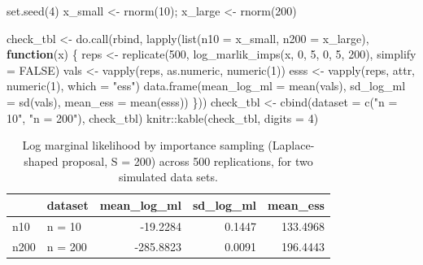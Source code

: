 \documentclass[
  letterpaper,
  DIV=11,
  numbers=noendperiod]{scrreprt}
\newenvironment{Shaded}{\begin{snugshade}}{\end{snugshade}}
\newcommand{\AttributeTok}[1]{\textcolor[rgb]{0.40,0.45,0.13}{#1}}
\newcommand{\ConstantTok}[1]{\textcolor[rgb]{0.56,0.35,0.01}{#1}}
\newcommand{\ControlFlowTok}[1]{\textcolor[rgb]{0.00,0.23,0.31}{\textbf{#1}}}
\newcommand{\DecValTok}[1]{\textcolor[rgb]{0.68,0.00,0.00}{#1}}
\newcommand{\FunctionTok}[1]{\textcolor[rgb]{0.28,0.35,0.67}{#1}}
\newcommand{\NormalTok}[1]{\textcolor[rgb]{0.00,0.23,0.31}{#1}}
\newcommand{\OtherTok}[1]{\textcolor[rgb]{0.00,0.23,0.31}{#1}}
\newcommand{\SpecialCharTok}[1]{\textcolor[rgb]{0.37,0.37,0.37}{#1}}
\newcommand{\StringTok}[1]{\textcolor[rgb]{0.13,0.47,0.30}{#1}}
\begin{document}
\begin{Shaded}
\begin{Highlighting}[]
\FunctionTok{set.seed}\NormalTok{(}\DecValTok{4}\NormalTok{)}
\NormalTok{x\_small }\OtherTok{\textless{}{-}} \FunctionTok{rnorm}\NormalTok{(}\DecValTok{10}\NormalTok{);  x\_large }\OtherTok{\textless{}{-}} \FunctionTok{rnorm}\NormalTok{(}\DecValTok{200}\NormalTok{)}

\NormalTok{check\_tbl }\OtherTok{\textless{}{-}} \FunctionTok{do.call}\NormalTok{(rbind, }\FunctionTok{lapply}\NormalTok{(}\FunctionTok{list}\NormalTok{(}\AttributeTok{n10 =}\NormalTok{ x\_small, }\AttributeTok{n200 =}\NormalTok{ x\_large), }\ControlFlowTok{function}\NormalTok{(x) \{}
\NormalTok{    reps }\OtherTok{\textless{}{-}} \FunctionTok{replicate}\NormalTok{(}\DecValTok{500}\NormalTok{, }\FunctionTok{log\_marlik\_imps}\NormalTok{(x, }\DecValTok{0}\NormalTok{, }\DecValTok{5}\NormalTok{, }\DecValTok{0}\NormalTok{, }\DecValTok{5}\NormalTok{, }\DecValTok{200}\NormalTok{), }\AttributeTok{simplify =} \ConstantTok{FALSE}\NormalTok{)}
\NormalTok{    vals }\OtherTok{\textless{}{-}} \FunctionTok{vapply}\NormalTok{(reps, as.numeric, }\FunctionTok{numeric}\NormalTok{(}\DecValTok{1}\NormalTok{))}
\NormalTok{    esss }\OtherTok{\textless{}{-}} \FunctionTok{vapply}\NormalTok{(reps, attr, }\FunctionTok{numeric}\NormalTok{(}\DecValTok{1}\NormalTok{), }\AttributeTok{which =} \StringTok{"ess"}\NormalTok{)}
    \FunctionTok{data.frame}\NormalTok{(}\AttributeTok{mean\_log\_ml =} \FunctionTok{mean}\NormalTok{(vals), }\AttributeTok{sd\_log\_ml =} \FunctionTok{sd}\NormalTok{(vals), }\AttributeTok{mean\_ess =} \FunctionTok{mean}\NormalTok{(esss))}
\NormalTok{\}))}
\NormalTok{check\_tbl }\OtherTok{\textless{}{-}} \FunctionTok{cbind}\NormalTok{(}\AttributeTok{dataset =} \FunctionTok{c}\NormalTok{(}\StringTok{"n = 10"}\NormalTok{, }\StringTok{"n = 200"}\NormalTok{), check\_tbl)}
\NormalTok{knitr}\SpecialCharTok{::}\FunctionTok{kable}\NormalTok{(check\_tbl, }\AttributeTok{digits =} \DecValTok{4}\NormalTok{)}
\end{Highlighting}
\end{Shaded}

{

\begin{longtable}[]{@{}llrrr@{}}

\caption{\label{tbl-marlik-check}Log marginal likelihood by importance
sampling (Laplace-shaped proposal, S = 200) across 500 replications, for
two simulated data sets.}

\tabularnewline

\toprule\noalign{}
& dataset & mean\_log\_ml & sd\_log\_ml & mean\_ess \\
\midrule\noalign{}
\endhead
\bottomrule\noalign{}
\endlastfoot
n10 & n = 10 & -19.2284 & 0.1447 & 133.4968 \\
n200 & n = 200 & -285.8823 & 0.0091 & 196.4443 \\

\end{longtable}

}
\end{document}
